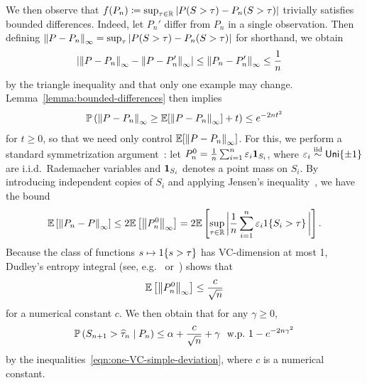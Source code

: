 \documentclass{article}
\newcommand{\scorefunc}{s}
\newcommand{\scoreval}{\scorefunc}
\newcommand{\scorerv}{S}
\begin{document}
We then observe that $f(P_n) \defeq \sup_{\tau \in \R} |P(\scorerv > \tau) -
P_n(\scorerv > \tau)|$ trivially satisfies bounded differences.
%
Indeed, let $P_n'$ differ from $P_n$ in a single observation.
%
Then
defining $\linf{P - P_n} = \sup_\tau |P(\scorerv > \tau)
- P_n(\scorerv > \tau)|$ for shorthand, we obtain
\begin{align*}
  \left|\left\|{P - P_n}\right\|_\infty - \left\|{P - P_n'}\right\|_\infty\right|
  & \le
  \left\|{P_n - P_n'}\right\|_\infty
  \le \frac{1}{n}
\end{align*}
by the triangle inequality and that only one example may change.
%
Lemma~\ref{lemma:bounded-differences} then implies
\begin{align*}
  \mathbb{P}\left(\left\|{P - P_n}\right\|_\infty \ge \mathbb{E}[\left\|{P - P_n}\right\|_\infty]
  + t \right) \le e^{-2nt^2}
\end{align*}
for $t \ge 0$, so that we need only control $\mathbb{E}[\left\|{P - P_n}\right\|_\infty]$.
%
For this, we perform a standard symmetrization
argument~\cite[e.g.][Ch.~2.3]{VanDerVaartWe96}: let $P_n^0 = \frac{1}{n}
\sum_{i = 1}^n \varepsilon_i \pointmass_{\scorerv_i}$, where $\varepsilon_i
\stackrel{\rm iid}{\sim} \mathsf{Uni}\{\pm 1\}$ are i.i.d.\ Rademacher variables
and $\pointmass_{\scorerv_i}$ denotes a point mass on $\scorerv_i$.
%
By introducing independent copies of $\scorerv_i$
and applying Jensen's inequality~\cite[Lemma 2.3.1]{VanDerVaartWe96},
we have the bound
\begin{equation*}
  \E\left[\linf{P_n - P}\right]
  \le 2 \E\left[\linf{P_n^0}\right]
  = 2 \E\left[\sup_{\tau \in \R} \bigg|\frac{1}{n}
    \sum_{i = 1}^n \varepsilon_i \indic{\scorerv_i > \tau}
    \bigg|\right].
\end{equation*}
Because the class of functions $\scoreval \mapsto \indic{\scoreval > \tau}$
has VC-dimension at most 1, Dudley's entropy
integral (see, e.g.~\cite[Corollary 2.2.8 and Thm.~2.6.7]{VanDerVaartWe96}
or~\cite[Eq.~(5.5.1)]{Wainwright19}) shows that
\begin{equation*}
  \mathbb{E}\left[\left\|{P_n^0}\right\|_\infty\right]
  \le \frac{c}{\sqrt{n}}
\end{equation*}
for a numerical constant $c$.
%
We then obtain that for any $\gamma \ge 0$,
\begin{align*}
  \P\left(\scorerv_{n + 1} > \what{\tau}_n \mid P_n\right)
  \le \alpha + \frac{c}{\sqrt{n}} + \gamma
  ~~ \mbox{w.p.}~
  1 - e^{-2n \gamma^2}
\end{align*}
by the inequalities~\eqref{eqn:one-VC-simple-deviation}, where
$c$ is a numerical constant.
\end{document}
